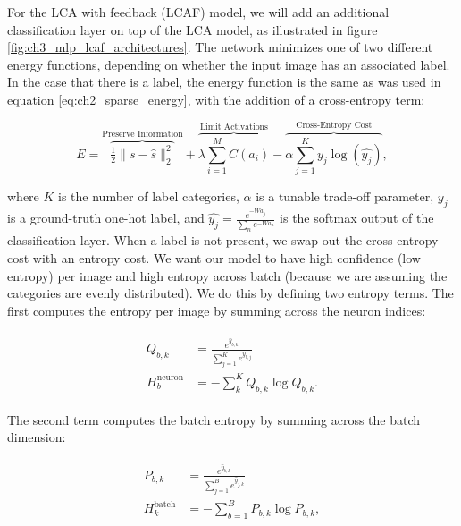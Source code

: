For the LCA with feedback (LCAF) model, we will add an additional classification layer on top of the LCA model, as illustrated in figure \ref{fig:ch3_mlp_lcaf_architectures}. The network minimizes one of two different energy functions, depending on whether the input image has an associated label. In the case that there is a label, the energy function is the same as was used in equation \eqref{eq:ch2_sparse_energy}, with the addition of a cross-entropy term:

\begin{equation}\label{eq:ch3_lcaf_supervised_energy}
         E =
        \overbrace{ \tfrac{1}{2} \| s - \hat{s} \|_{2}^{2} }^\text{Preserve Information} +
        \overbrace{ \lambda \sum\limits_{i=1}^{M}C(a_{i}) }^\text{Limit Activations} -
        \overbrace{ \alpha \sum\limits_{j=1}^{K} y_{j}\log(\hat{y_{j}})}^\text{Cross-Entropy Cost},
\end{equation}

\noindent where $K$ is the number of label categories, $\alpha$ is a tunable trade-off parameter, $y_{j}$ is a ground-truth one-hot label, and $\hat{y_{j}} = \frac{e^{-Wa_{j}}}{\sum_{n}e^{-Wa_{n}}}$ is the softmax output of the classification layer. When a label is not present, we swap out the cross-entropy cost with an entropy cost. We want our model to have high confidence (low entropy) per image and high entropy across batch (because we are assuming the categories are evenly distributed). We do this by defining two entropy terms. The first computes the entropy per image by summing across the neuron indices:

\begin{align}\label{eq:ch3_lcaf_q_dist}
\begin{split}
  Q_{b,k} &= \frac{e^{\hat{y}_{b,k}}}{\sum\limits_{j=1}^{K}e^{\hat{y}_{b,j}}} \\
  H^{\text{neuron}}_{b} &= -\sum\limits_{k}^{K}Q_{b,k}\log Q_{b,k}.
 \end{split}
\end{align}

The second term computes the batch entropy by summing across the batch dimension:

\begin{align}\label{eq:ch3_lcaf_p_dist}
\begin{split}
  P_{b,k} &= \frac{e^{\hat{y}_{b,k}}}{\sum\limits_{j=1}^{B} e^{\hat{y}_{j,k}}} \\
  H^{\text{batch}}_{k} &= -\sum\limits_{b=1}^{B}P_{b,k}\log P_{b,k},
 \end{split}
\end{align}

